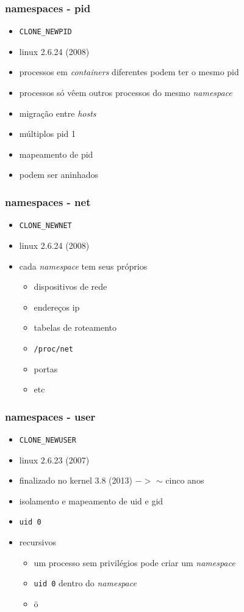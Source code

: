 \documentclass{beamer}
\begin{document}
\begin{frame}
    \frametitle{namespaces - pid}
    \begin{itemize}
        \item \texttt{CLONE\_NEWPID}
        \item linux 2.6.24 (2008)
        \item processos em \textit{containers} diferentes podem ter o mesmo pid
        \item processos só vêem outros processos do mesmo \textit{namespace}
        \item migração entre \textit{hosts}
        \item múltiplos pid 1
        \item mapeamento de pid
        \item podem ser aninhados
    \end{itemize}
\end{frame}

\begin{frame}
    \frametitle{namespaces - net}
    \begin{itemize}
        \item \texttt{CLONE\_NEWNET}
        \item linux 2.6.24 (2008)
        \item cada \textit{namespace} tem seus próprios
            \begin{itemize}
                \item dispositivos de rede
                \item endereços ip
                \item tabelas de roteamento
                \item \texttt{/proc/net}
                \item portas
                \item etc
            \end{itemize}
    \end{itemize}
\end{frame}

\begin{frame}
    \frametitle{namespaces - user}
    \begin{itemize}
        \item \texttt{CLONE\_NEWUSER}
        \item linux 2.6.23 (2007)
        \item finalizado no kernel 3.8 (2013) $->$ $\sim$ cinco anos
        \item isolamento e mapeamento de uid e gid
        \item \texttt{uid 0}
        \item recursivos
        \begin{itemize}
            \item um processo sem privilégios pode criar um \textit{namespace}
            \item \texttt{uid 0} dentro do \textit{namespace}
            \item ö
        \end{itemize}
    \end{itemize}
\end{frame}
\end{document}
